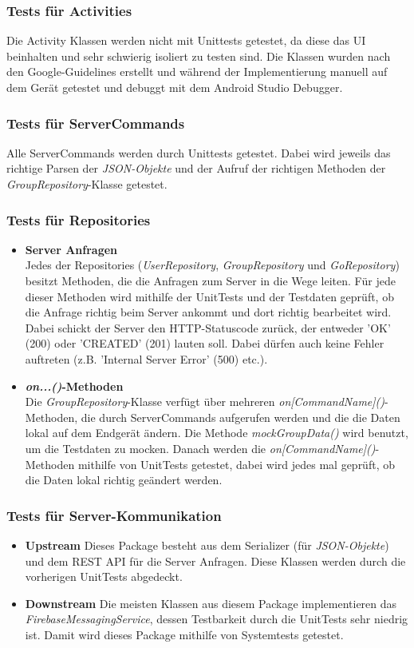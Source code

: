 \documentclass[11pt,a4paper]{scrartcl}
\begin{document}
\subsubsection{Tests für Activities}
Die Activity Klassen werden nicht mit Unittests getestet, da diese das UI beinhalten und sehr schwierig isoliert zu testen sind. Die Klassen wurden nach den Google-Guidelines erstellt und während der Implementierung manuell auf dem Gerät getestet und debuggt mit dem Android Studio Debugger.

\subsubsection{Tests für ServerCommands}
Alle ServerCommands werden durch Unittests getestet. Dabei wird jeweils das richtige Parsen der \textit{JSON-Objekte} und der Aufruf der richtigen Methoden der \textit{GroupRepository}-Klasse getestet.

\subsubsection{Tests für Repositories}
\begin{itemize}
	\item \textbf{Server Anfragen} \\ Jedes der Repositories (\textit{UserRepository}, \textit{GroupRepository} und \textit{GoRepository}) besitzt Methoden, die die Anfragen zum Server in die Wege leiten. Für jede dieser Methoden wird mithilfe der UnitTests und der Testdaten geprüft, ob die Anfrage richtig beim Server ankommt und dort richtig bearbeitet wird. Dabei schickt der Server den HTTP-Statuscode zurück, der entweder 'OK' (200) oder 'CREATED' (201) lauten soll. Dabei dürfen auch keine Fehler auftreten (z.B. 'Internal Server Error' (500) etc.).
	\item \textbf{\textit{on...()}-Methoden} \\ Die \textit{GroupRepository}-Klasse verfügt über mehreren \textit{on[CommandName]()}-Methoden, die durch ServerCommands aufgerufen werden und die die Daten lokal auf dem Endgerät ändern. Die Methode \textit{mockGroupData()} wird benutzt, um die Testdaten zu mocken. Danach werden die \textit{on[CommandName]()}-Methoden mithilfe von UnitTests getestet, dabei wird jedes mal geprüft, ob die Daten lokal richtig geändert werden.
\end{itemize}

\subsubsection{Tests für Server-Kommunikation}
\begin{itemize}
	\item \textbf{Upstream} Dieses Package besteht aus dem Serializer (für \textit{JSON-Objekte}) und dem REST API für die Server Anfragen. Diese Klassen werden durch die vorherigen UnitTests abgedeckt.
	\item \textbf{Downstream} Die meisten Klassen aus diesem Package implementieren das \textit{FirebaseMessagingService}, dessen Testbarkeit durch die UnitTests sehr niedrig ist. Damit wird dieses Package mithilfe von Systemtests getestet.
\end{itemize}
\end{document}
